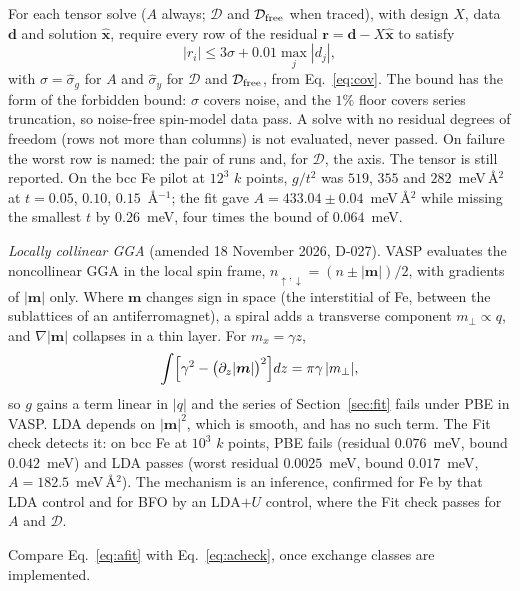 \documentclass[11pt,a4paper]{article}
\numberwithin{equation}{section}
\newcommand{\vct}[1]{\bm{#1}}
\newcommand{\Dt}{\mathcal D}
\begin{document}
\begin{description}[style=nextline,leftmargin=0pt,labelsep=0pt]
\item[Fit: does the series describe the data?]
For each tensor solve ($A$ always; $\Dt$ and $\Dt_{\rm free}$ when traced), with
design $X$, data $\vct d$ and solution $\hat{\vct x}$, require every row of the
residual $\vct r=\vct d-X\hat{\vct x}$ to satisfy
\[
 |r_i|\le3\sigma+0.01\max_j|d_j|,
\]
with $\sigma=\hat\sigma_g$ for $A$ and $\hat\sigma_y$ for $\Dt$ and
$\Dt_{\rm free}$, from Eq.~\eqref{eq:cov}. The bound has the form of the forbidden
bound: $\sigma$ covers noise, and the $1\%$ floor covers series truncation, so
noise-free spin-model data pass. A solve with no residual degrees of freedom
(rows not more than columns) is not evaluated, never passed. On failure the
worst row is named: the pair of runs and, for $\Dt$, the axis. The tensor is
still reported. On the bcc Fe pilot at $12^3$ $k$ points, $g/t^2$ was $519$,
$355$ and $282$~meV\,\AA$^2$ at $t=0.05$, $0.10$, $0.15$~\AA$^{-1}$; the fit gave
$A=433.04\pm0.04$~meV\,\AA$^2$ while missing the smallest $t$ by $0.26$~meV,
four times the bound of $0.064$~meV.

\emph{Locally collinear GGA} (amended 18 November 2026, D-027). VASP evaluates
the noncollinear GGA in the local spin frame, $n_{\uparrow,\downarrow}=(n\pm|\vct m|)/2$,
with gradients of $|\vct m|$ only. Where $\vct m$ changes sign in space (the
interstitial of Fe, between the sublattices of an antiferromagnet), a spiral
adds a transverse component $m_\perp\propto q$, and $\nabla|\vct m|$ collapses in
a thin layer. For $m_x=\gamma z$,
\[
 \int\Bigl[\gamma^2-\bigl(\partial_z|\vct m|\bigr)^2\Bigr]dz=\pi\gamma\,|m_\perp|,
\]
so $g$ gains a term linear in $|q|$ and the series of Section~\ref{sec:fit} fails
under PBE in VASP. LDA depends on $|\vct m|^2$, which is smooth, and has no such
term. The Fit check detects it: on bcc Fe at $10^3$ $k$ points, PBE fails
(residual $0.076$~meV, bound $0.042$~meV) and LDA passes (worst residual
$0.0025$~meV, bound $0.017$~meV, $A=182.5$~meV\,\AA$^2$). The mechanism is an
inference, confirmed for Fe by that LDA control and for BFO by an LDA$+U$
control, where the Fit check passes for $A$ and $\Dt$.

\item[Cross-check: do the two stiffness routes agree?]
Compare Eq.~\eqref{eq:afit} with Eq.~\eqref{eq:acheck}, once exchange classes
are implemented.


\end{description}
\end{document}
